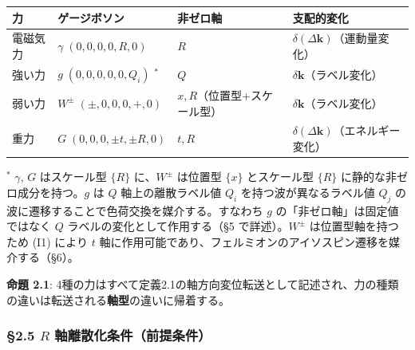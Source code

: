 \documentclass[
  a4paper,11pt]{ltjsarticle}
\newcounter{none}
\theoremstyle{definition}
\theoremstyle{remark}
\begin{document}
{\def\LTcaptype{none} %
\begin{longtable}[]{@{}
  >{\raggedright\arraybackslash}p{}
  >{\raggedright\arraybackslash}p{}
  >{\raggedright\arraybackslash}p{}
  >{\raggedright\arraybackslash}p{}@{}}
\toprule\noalign{}
\begin{minipage}[b]{\linewidth}\raggedright
力
\end{minipage} & \begin{minipage}[b]{\linewidth}\raggedright
ゲージボソン
\end{minipage} & \begin{minipage}[b]{\linewidth}\raggedright
非ゼロ軸
\end{minipage} & \begin{minipage}[b]{\linewidth}\raggedright
支配的変化
\end{minipage} \\
\midrule\noalign{}
\endhead
\bottomrule\noalign{}
\endlastfoot
電磁気力 & \(\gamma\; (0,0,0,0,R,0)\) & \(R\) &
\(\delta(\Delta\mathbf{k})\)（運動量変化） \\
強い力 & \(g\; (0,0,0,0,0,Q_i)\) \({}^{*}\) & \(Q\) &
\(\delta\mathbf{k}\)（ラベル変化） \\
弱い力 & \(W^{\pm}\; (\pm, 0, 0, 0, +, 0)\) &
\(x, R\)（位置型+スケール型） & \(\delta\mathbf{k}\)（ラベル変化） \\
重力 & \(G\; (0,0,0,\pm t,\pm R,0)\) & \(t, R\) &
\(\delta(\Delta\mathbf{k})\)（エネルギー変化） \\
\end{longtable}
}

\({}^{*}\) \(\gamma\), \(G\) はスケール型 \(\{R\}\) に、\(W^{\pm}\)
は位置型 \(\{x\}\) とスケール型 \(\{R\}\)
に静的な非ゼロ成分を持つ。\(g\) は \(Q\) 軸上の離散ラベル値 \(Q_i\)
を持つ波が異なるラベル値 \(Q_j\)
の波に遷移することで色荷交換を媒介する。すなわち \(g\)
の「非ゼロ軸」は固定値ではなく \(Q\) ラベルの変化として作用する（§5
で詳述）。\(W^{\pm}\) は位置型軸を持つため (I1) により \(t\)
軸に作用可能であり、フェルミオンのアイソスピン遷移を媒介する（§6）。

\textbf{命題 2.1}:
4種の力はすべて定義2.1の軸方向変位転送として記述され、力の種類の違いは転送される\textbf{軸型}の違いに帰着する。

\subsubsection{\texorpdfstring{§2.5 \(R\)
軸離散化条件（前提条件）}{§2.5 R 軸離散化条件（前提条件）}}\label{r-ux8ef8ux96e2ux6563ux5316ux6761ux4ef6ux524dux63d0ux6761ux4ef6}
\end{document}
